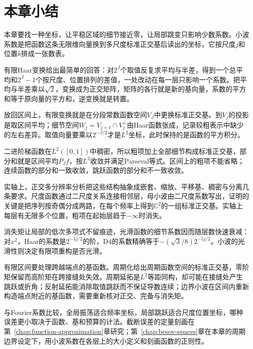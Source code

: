 \section{本章小结}
\label{sec:wavelet-summary}

本章要找一种坐标，让平稳区域的细节接近零，让局部跳变只影响少数系数。小波系数是把函数这条无限维向量换到多尺度标准正交基后读出的坐标，它按尺度$j$和位置$k$排成一张数表。

有限Haar变换给出最简单的回答：对$2^J$个取值反复求平均与半差，得到一个总平均和$2^J-1$个按尺度、位置排列的差值，一处改动在每一层只影响一个系数。把平均与半差乘以$\sqrt2$，变换成为正交矩阵，矩阵的各行就是新的基向量，系数的平方和等于原向量的平方和，逆变换就是转置。

放回区间上，有限变换就是在分段常数函数空间$V_J$中更换标准正交基。到$V_j$的投影是取区间平均；细节空间$W_j=V_{j+1}\cap V_j^{\perp}$由Haar函数张成，记录较粗表示中缺少的左右差异。取值向量要乘以$2^{-J/2}$才是$L^2$坐标，此时保持的是函数的平方积分。

二进阶梯函数在$L^2([0,1])$中稠密，所以粗项加上全部细节构成标准正交基，部分和就是区间平均$P_Jf$，按$L^2$收敛并满足Parseval等式。区间上的粗项不能省略；连续函数的部分和一致收敛，跳跃函数的部分和不一致收敛。

实轴上，正交多分辨率分析把这些结构抽象成嵌套、缩放、平移基、稠密与分离几条要求。尺度函数通过二尺度关系连接相邻层，母小波由二尺度系数写出，证明的关键是把序列按奇偶分成两路，在每个频率上得到$\mathbb C^2$的一组标准正交基。实轴上每层有无限多个位置，粗项在起始层趋于$-\infty$时消失。

消失矩让局部的低次多项式不留痕迹，光滑函数的细节系数因而随层数快速衰减：对$x^2$，Haar的系数是$2^{-3j/2}$的阶，D4的系数精确等于$-(\sqrt3/8)2^{-5j/2}$。小波的光滑性则决定有限项重构是否光滑。

有限区间要处理跨越端点的基函数。周期化给出周期函数空间的标准正交基，零阶矩保留而高阶矩在跨接缝处失效。周期延拓是$L^2$等距同构，却可能在接缝处产生跳跃或折角；反射延拓能消除取值跳跃而不保证导数连续；边界小波在区间内重新构造端点附近的基函数，需要重新核对正交、完备与消失矩。

与Fourier系数比较，全局振荡适合频率坐标，局部跳跃适合尺度位置坐标，哪种误差更小取决于函数、基和预算的计法。截断误差的定量刻画在第~\ref{chap:function-approximation}章研究；第~\ref{chap:besov-spaces}章在本章的周期边界设定下，用小波系数在各层上的大小定义和刻画函数的正则性。
